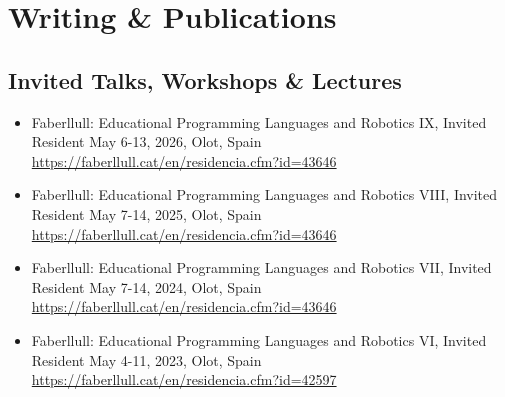 \section{Writing \& Publications}
\vspace{6pt}

\subsection{Invited Talks, Workshops \& Lectures}

\vspace{5pt}

\begin{itemize}
    \setlength\itemsep{1em}
    \item{Faberllull: Educational Programming Languages and Robotics IX, Invited Resident
    \newline
    May 6-13, 2026, Olot, Spain
    \newline
    \href{https://faberllull.cat/en/residencia.cfm?id=43646&url=educational-programming-and-robotics-2024.htm}{https://faberllull.cat/en/residencia.cfm?id=43646}
    }

    \item{Faberllull: Educational Programming Languages and Robotics VIII, Invited Resident
    \newline
    May 7-14, 2025, Olot, Spain
    \newline
    \href{https://faberllull.cat/en/residencia.cfm?id=43646&url=educational-programming-and-robotics-2024.htm}{https://faberllull.cat/en/residencia.cfm?id=43646}
    }


    \item{Faberllull: Educational Programming Languages and Robotics VII, Invited Resident
    \newline
    May 7-14, 2024, Olot, Spain
    \newline
    \href{https://faberllull.cat/en/residencia.cfm?id=43646&url=educational-programming-and-robotics-2024.htm}{https://faberllull.cat/en/residencia.cfm?id=43646}}

    \item{Faberllull: Educational Programming Languages and Robotics VI, Invited Resident
    \newline
    May 4-11, 2023, Olot, Spain
    \newline
    \href{https://faberllull.cat/en/residencia.cfm?id=42597\&url=educational-programming-and-robotics-vi.htm}{https://faberllull.cat/en/residencia.cfm?id=42597}}
    

\end{itemize}
